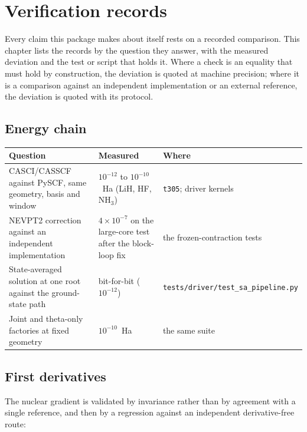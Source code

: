 \chapter{Verification records}
\label{ch:verification}

Every claim this package makes about itself rests on a recorded
comparison.  This chapter lists the records by the question they
answer, with the measured deviation and the test or script that holds
it.  Where a check is an equality that must hold by construction, the
deviation is quoted at machine precision; where it is a comparison
against an independent implementation or an external reference, the
deviation is quoted with its protocol.

\section{Energy chain}

\begin{center}
\begin{tabular}{p{}p{}p{}}
\toprule
Question & Measured & Where \\
\midrule
CASCI/CASSCF against PySCF, same geometry, basis and window &
$10^{-12}$ to $10^{-10}$~Ha (LiH, HF, NH$_3$) &
\texttt{t305}; driver kernels \\
NEVPT2 correction against an independent implementation &
$4\times 10^{-7}$ on the large-core test after the block-loop fix &
the frozen-contraction tests \\
State-averaged solution at one root against the ground-state path &
bit-for-bit ($10^{-12}$) &
\texttt{tests/driver/\allowbreak test\_sa\_\allowbreak pipeline.py} \\
Joint and theta-only factories at fixed geometry &
$10^{-10}$~Ha &
the same suite \\
\bottomrule
\end{tabular}
\end{center}

\section{First derivatives}

The nuclear gradient is validated by invariance rather than by
agreement with a single reference, and then by a regression against
an independent derivative-free route:

